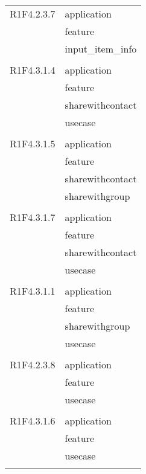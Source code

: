\begin{center}
\begin{longtable}{|p{7cm}|p{5cm}|}
		R1F4.2.3.7 & application \\ & feature \\ & input\_item\_info \\ & \\ \hline
		R1F4.3.1.4 & application \\ & feature \\ & sharewithcontact \\ & usecase \\ & \\ \hline
		R1F4.3.1.5 & application \\ & feature \\ & sharewithcontact \\ & sharewithgroup \\ & \\ \hline
		R1F4.3.1.7 & application \\ & feature \\ & sharewithcontact \\ & usecase \\ & \\ \hline
		R1F4.3.1.1 & application \\ & feature \\ & sharewithgroup \\ & usecase \\ & \\ \hline
		R1F4.2.3.8 & application \\ & feature \\ & usecase \\ & \\ \hline
		R1F4.3.1.6 & application \\ & feature \\ & usecase \\ & \\ \hline
	\end{longtable}
\end{center}
